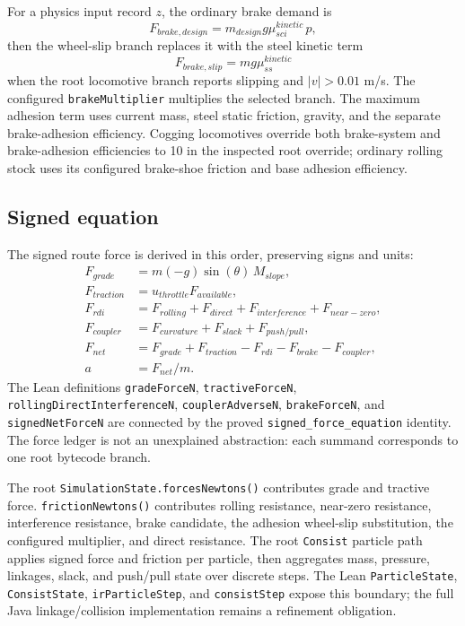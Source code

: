 \documentclass[10pt,a4paper]{article}
\newcommand{\Lean}[1]{\texttt{#1}}
\begin{document}
For a physics input record $z$, the ordinary brake demand is
\[
 F_{brake,design}
   =m_{design}g\mu_{sci}^{kinetic}\,p,
\]
then the wheel-slip branch replaces it with the steel kinetic term
\[
 F_{brake,slip}=m g\mu_{ss}^{kinetic}
\]
when the root locomotive branch reports slipping and $|v|>0.01$ m/s.  The
configured \texttt{brakeMultiplier} multiplies the selected branch.  The
maximum adhesion term uses current mass, steel static friction, gravity, and
the separate brake-adhesion efficiency.  Cogging locomotives override both
brake-system and brake-adhesion efficiencies to 10 in the inspected root
override; ordinary rolling stock uses its configured brake-shoe friction and
base adhesion efficiency.

\subsection{Signed equation}

The signed route force is derived in this order, preserving signs and units:
\begin{align*}
 F_{grade} &= m(-g)\sin(\theta)\,M_{slope},\\
 F_{traction} &= u_{throttle}F_{available},\\
 F_{rdi} &= F_{rolling}+F_{direct}+F_{interference}+F_{near-zero},\\
 F_{coupler} &= F_{curvature}+F_{slack}+F_{push/pull},\\
 F_{net} &= F_{grade}+F_{traction}-F_{rdi}-F_{brake}-F_{coupler},\\
 a &= F_{net}/m.
\end{align*}
The Lean definitions \Lean{gradeForceN}, \Lean{tractiveForceN},
\Lean{rollingDirectInterferenceN}, \Lean{couplerAdverseN},
\Lean{brakeForceN}, and \Lean{signedNetForceN} are connected by the
proved \Lean{signed\_force\_equation} identity.  The force ledger is not an
unexplained abstraction: each summand corresponds to one root bytecode branch.

The root \texttt{SimulationState.forcesNewtons()} contributes grade and
tractive force.  \texttt{frictionNewtons()} contributes rolling resistance,
near-zero resistance, interference resistance, brake candidate, the adhesion
wheel-slip substitution, the configured multiplier, and direct resistance.
The root \texttt{Consist} particle path applies signed force and friction per
particle, then aggregates mass, pressure, linkages, slack, and push/pull state
over discrete steps.  The Lean \Lean{ParticleState}, \Lean{ConsistState},
\Lean{irParticleStep}, and \Lean{consistStep} expose this boundary; the
full Java linkage/collision implementation remains a refinement obligation.
\end{document}
